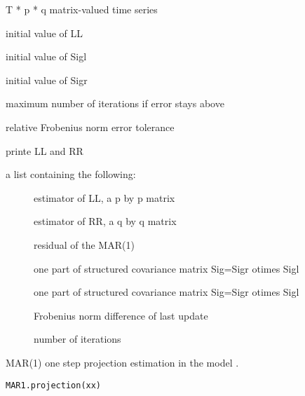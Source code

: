 \documentclass[a4paper]{book}
\begin{document}
\begin{Arguments}
\begin{ldescription}
\item[\code{xx}] T * p * q matrix-valued time series

\item[\code{LL.init}] initial value of LL

\item[\code{Sigl.init}] initial value of Sigl

\item[\code{Sigr.init}] initial value of Sigr

\item[\code{niter}] maximum number of iterations if error stays above 

\item[\code{tol}] relative Frobenius norm error tolerance

\item[\code{print.true}] printe LL and RR
\end{ldescription}
\end{Arguments}
%
\begin{Value}
a list containing the following:\begin{description}

\item[] estimator of LL, a p by p matrix
\item[] estimator of RR, a q by q matrix
\item[] residual of the MAR(1)
\item[] one part of structured covariance matrix Sig=Sigr otimes Sigl
\item[] one part of structured covariance matrix Sig=Sigr otimes Sigl
\item[] Frobenius norm difference of last update
\item[] number of iterations

\end{description}

\end{Value}
%
\begin{Description}\relax
MAR(1) one step projection estimation in the model .
\end{Description}
%
\begin{Usage}
\begin{verbatim}
MAR1.projection(xx)
\end{verbatim}
\end{Usage}
\end{document}
